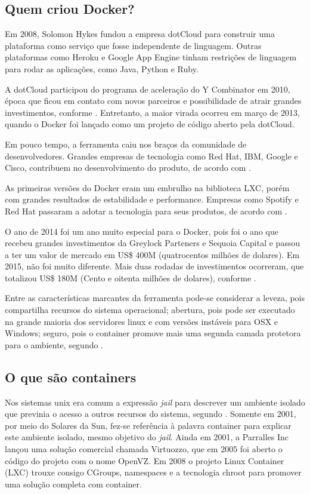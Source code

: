\documentclass[
	12pt,				%
	openright,			%
	oneside,			%
	a4paper,			%
	chapter=TITLE,		%
	section=TITLE,		%
	english,			%
	french,				%
	spanish,			%
	brazil				%
	]{abntex2}
\begin{document}
\subsection{Quem criou Docker?}

Em 2008, Solomon Hykes fundou a empresa dotCloud para construir uma plataforma como serviço que fosse independente de linguagem. Outras plataformas como Heroku e Google App Engine tinham restrições de linguagem para rodar as aplicações, como Java, Python e Ruby.

A dotCloud participou do programa de aceleração do Y Combinator em 2010, época que ficou em contato com novos parceiros e possibilidade de atrair grandes investimentos, conforme . Entretanto, a maior virada ocorreu em março de 2013, quando o Docker foi lançado como um projeto de código aberto pela dotCloud.

Em pouco tempo, a ferramenta caiu nos braços da comunidade de desenvolvedores. Grandes empresas de tecnologia como Red Hat, IBM, Google e Cisco, contribuem no desenvolvimento do produto, de acordo com .

As primeiras versões do Docker eram um embrulho na biblioteca LXC, porém com grandes resultados de estabilidade e performance. Empresas como Spotify e Red Hat passaram a adotar a tecnologia para seus produtos, de acordo com .

O ano de 2014 foi um ano muito especial para o Docker, pois foi o ano que recebeu grandes investimentos da Greylock Parteners e Sequoia Capital e passou a ter um valor de mercado em US\$ 400M (quatrocentos milhões de dolares). Em 2015, não foi muito diferente. Mais duas rodadas de investimentos ocorreram, que totalizou US\$ 180M (Cento e oitenta milhões de dolares), conforme  . 

Entre as características marcantes da ferramenta pode-se considerar a leveza, pois compartilha recursos do sistema operacional; abertura, pois pode ser executado na grande maioria dos servidores linux e com versões instáveis para OSX e Windows; seguro, pois o container promove mais uma segunda camada protetora para o ambiente, segundo .

\subsection{O que são containers}

Nos sistemas unix era comum a expressão \textit{jail} para descrever um ambiente isolado que previnia o acesso a outros recursos do sistema, segundo . Somente em 2001, por meio do Solares da Sun, fez-se referência à palavra container para explicar este ambiente isolado, mesmo objetivo do \textit{jail}. Ainda em 2001, a Parralles Inc lançou uma solução comercial chamada Virtuozzo, que em 2005 foi aberto o código do projeto com o nome OpenVZ. Em 2008 o projeto Linux Container (LXC) trouxe consigo CGroups, namespaces e a tecnologia chroot para promover uma solução completa com container.
\end{document}
